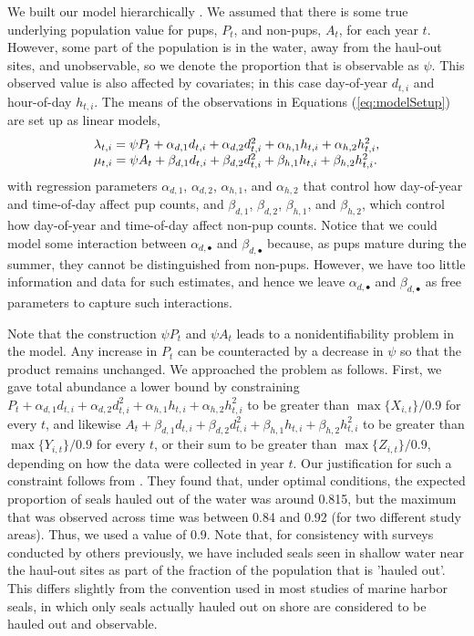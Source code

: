 \documentclass[12pt, titlepage]{article}\usepackage[]{graphicx}\usepackage[]{color}
\begin{document}
We built our model hierarchically \citep{Cres:Cald:Clar:VerH:acco:2009}.  We assumed that there is some true underlying population value for pups, $P_t$, and non-pups, $A_t$, for each year $t$. However, some part of the population is in the water, away from the haul-out sites, and unobservable, so we denote the proportion that is observable as $\psi$. This observed value is also affected by covariates; in this case day-of-year $d_{t,i}$ and hour-of-day $h_{t,i}$. The means of the observations in Equations (\ref{eq:modelSetup}) are set up as linear models,
%
\begin{equation} \label{eq:linModels}
  \begin{tabular}{l}
    $\lambda_{t,i} = \psi P_t + \alpha_{d,1}d_{t,i} + \alpha_{d,2}d^2_{t,i} + \alpha_{h,1}h_{t,i} + \alpha_{h,2}h^2_{t,i}$, \\
    $\mu_{t,i} = \psi A_t + \beta_{d,1}d_{t,i} + \beta_{d,2}d^2_{t,i} + \beta_{h,1}h_{t,i} + \beta_{h,2}h^2_{t,i}$.
  \end{tabular}
\end{equation}
%
with regression parameters $\alpha_{d,1}$, $\alpha_{d,2}$, $\alpha_{h,1}$, and $\alpha_{h,2}$ that control how day-of-year and time-of-day affect pup counts, and $\beta_{d,1}$, $\beta_{d,2}$, $\beta_{h,1}$, and $\beta_{h,2}$, which control how day-of-year and time-of-day affect non-pup counts.  Notice that we could model some interaction between $\alpha_{d,\bullet}$ and $\beta_{d,\bullet}$ because, as pups mature during the summer, they cannot be distinguished from non-pups.  However, we have too little information and data for such estimates, and hence we leave $\alpha_{d,\bullet}$ and $\beta_{d,\bullet}$ as free parameters to capture such interactions.

Note that the construction $\psi P_t$ and $\psi A_t$ leads to a nonidentifiability problem in the model. Any increase in $P_t$ can be counteracted by a decrease in $\psi$ so that the product remains unchanged.  We approached the problem as follows. First, we gave total abundance a lower bound by constraining $P_t + \alpha_{d,1}d_{t,i} + \alpha_{d,2}d^2_{t,i} + \alpha_{h,1}h_{t,i} + \alpha_{h,2}h^2_{t,i}$ to be greater than $\max\{X_{i,t}\}/0.9$ for every $t$, and likewise $A_t + \beta_{d,1}d_{t,i} + \beta_{d,2}d^2_{t,i} + \beta_{h,1}h_{t,i} + \beta_{h,2}h^2_{t,i}$ to be greater than $\max\{Y_{i,t}\}/0.9$ for every $t$, or their sum to be greater than $\max\{Z_{i,t}\}/0.9$, depending on how the data were collected in year $t$.   Our justification for such a constraint follows from \citet{Simp:With:Cesa:Bove:stab:2003}. They found that, under optimal conditions, the expected proportion of seals hauled out of the water was around 0.815, but the maximum that was observed across time was between 0.84 and 0.92 (for two different study areas).  Thus, we used a value of 0.9.  Note that, for consistency with  surveys conducted by others previously, we have included seals seen in shallow water near the haul-out sites as part of the fraction of the population that is 'hauled out'. This differs slightly from the convention used in most studies of marine harbor seals, in which only seals actually hauled out on shore are considered to be hauled out and observable.
\end{document}
